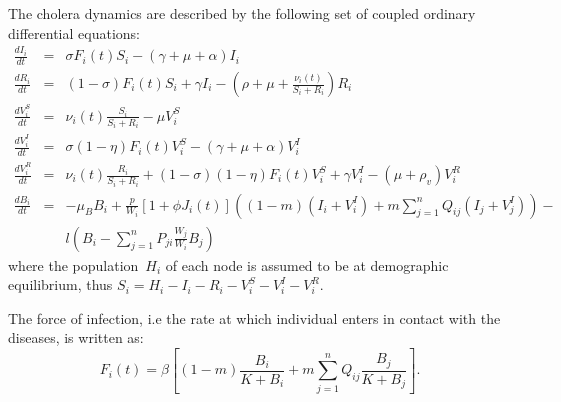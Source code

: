 The cholera dynamics are described by the following set of coupled ordinary differential equations:
\begin{eqnarray}
\frac{dI_i}{dt} &=& \sigma F_i(t) S_i - (\gamma + \mu + \alpha) I_i \label{eq:I2}\\
\frac{dR_i}{dt} &=& (1-\sigma) F_i(t) S_i + \gamma I_i - (\rho + \mu+\frac{\nu_i(t)}{S_i+R_i}) R_i \label{eq:R2}\\
\frac{dV^S_i}{dt} &=& \nu_i(t) \frac{S_i}{S_i+R_i}-\mu V^S_i \label{eq:VS2}\\
\frac{dV^I_i}{dt} &=& \sigma (1-\eta) F_i(t) V^S_i - (\gamma + \mu + \alpha) V^I_i \label{eq:VI2}\\
\frac{dV^R_i}{dt} &=& \nu_i(t) \frac{R_i}{S_i+R_i} + (1-\sigma) (1-\eta) F_i(t) V^S_i + \gamma V^I_i - (\mu+\rho_v) V^R_i \label{eq:VR2}\\
\frac{dB_i}{dt} &=& - \mu_B B_i +\frac{p}{W_i}\left[1 + \phi J_i(t) \right] \left((1-m)(I_i +V_i^I)+m \sum_{j=1}^n Q_{ij} (I_j +V_j^I)\right)- \nonumber \\
&& l \left( B_i - \sum_{j=1}^n P_{ji} \frac{W_j}{W_i} B_j \right)
\end{eqnarray}
%
where the population~$H_i$ of each node is assumed to be at demographic equilibrium, thus $S_i=H_i-I_i-R_i-V_i^S-V_i^I-V_i^R$.

The force of infection, i.e the rate at which individual enters in contact with the diseases, is written as:
%
\begin{equation}
F_i(t) = \beta \left[ (1 - m) \frac{B_i}{K + B_i} + m \sum_{j=1}^n Q_{ij} \frac{B_j}{K + B_j} \right].
\label{force}
\end{equation}

